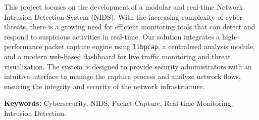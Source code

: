 This project focuses on the development of a modular and real-time Network Intrusion Detection System (NIDS). With the increasing complexity of cyber threats, there is a growing need for efficient monitoring tools that can detect and respond to suspicious activities in real-time. Our solution integrates a high-performance packet capture engine using \texttt{libpcap}, a centralized analysis module, and a modern web-based dashboard for live traffic monitoring and threat visualization. The system is designed to provide security administrators with an intuitive interface to manage the capture process and analyze network flows, ensuring the integrity and security of the network infrastructure.

\vspace{1cm}
\textbf{Keywords:} Cybersecurity, NIDS, Packet Capture, Real-time Monitoring, Intrusion Detection.
